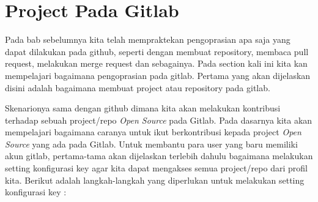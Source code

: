\section{Project Pada Gitlab}

Pada bab sebelumnya kita telah mempraktekan pengoprasian apa saja yang dapat dilakukan pada github, seperti dengan membuat repository, membaca pull request, melakukan merge request dan sebagainya. Pada section kali ini kita kan mempelajari bagaimana pengoprasian pada gitlab. Pertama yang akan dijelaskan disini adalah bagaimana membuat project atau repository pada gitlab. 

Skenarionya sama dengan github dimana kita akan melakukan kontribusi terhadap sebuah project/repo \textit{Open Source} pada Gitlab. Pada dasarnya kita akan mempelajari bagaimana caranya untuk ikut berkontribusi kepada project \textit{Open Source} yang ada pada Gitlab. Untuk membantu para user yang baru memiliki akun gitlab, pertama-tama akan dijelaskan terlebih dahulu bagaimana melakukan setting konfigurasi key agar kita dapat mengakses semua project/repo dari profil kita. Berikut adalah langkah-langkah yang diperlukan untuk melakukan setting konfigurasi key :
